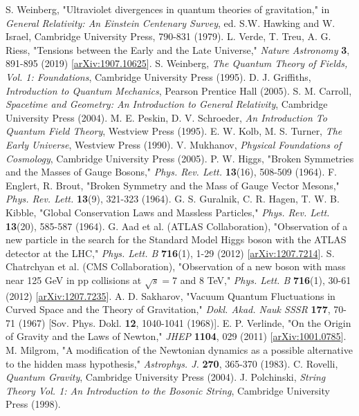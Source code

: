 \documentclass[11pt,a4paper]{article}
\begin{document}
\begin{thebibliography}{99}
 S. Weinberg, "Ultraviolet divergences in quantum theories of gravitation," in \textit{General Relativity: An Einstein Centenary Survey}, ed. S.W. Hawking and W. Israel, Cambridge University Press, 790-831 (1979). 
 L. Verde, T. Treu, A. G. Riess, "Tensions between the Early and the Late Universe," \textit{Nature Astronomy} \textbf{3}, 891-895 (2019) [\url{arXiv:1907.10625}]. 
 S. Weinberg, \textit{The Quantum Theory of Fields, Vol. 1: Foundations}, Cambridge University Press (1995). 
 D. J. Griffiths, \textit{Introduction to Quantum Mechanics}, Pearson Prentice Hall (2005). 
 S. M. Carroll, \textit{Spacetime and Geometry: An Introduction to General Relativity}, Cambridge University Press (2004). 
 M. E. Peskin, D. V. Schroeder, \textit{An Introduction To Quantum Field Theory}, Westview Press (1995). 
 E. W. Kolb, M. S. Turner, \textit{The Early Universe}, Westview Press (1990). 
 V. Mukhanov, \textit{Physical Foundations of Cosmology}, Cambridge University Press (2005). 
 P. W. Higgs, "Broken Symmetries and the Masses of Gauge Bosons," \textit{Phys. Rev. Lett.} \textbf{13}(16), 508-509 (1964). 
 F. Englert, R. Brout, "Broken Symmetry and the Mass of Gauge Vector Mesons," \textit{Phys. Rev. Lett.} \textbf{13}(9), 321-323 (1964). 
 G. S. Guralnik, C. R. Hagen, T. W. B. Kibble, "Global Conservation Laws and Massless Particles," \textit{Phys. Rev. Lett.} \textbf{13}(20), 585-587 (1964). 
 G. Aad et al. (ATLAS Collaboration), "Observation of a new particle in the search for the Standard Model Higgs boson with the ATLAS detector at the LHC," \textit{Phys. Lett. B} \textbf{716}(1), 1-29 (2012) [\url{arXiv:1207.7214}]. 
 S. Chatrchyan et al. (CMS Collaboration), "Observation of a new boson with mass near 125 GeV in pp collisions at $\sqrt{s}=7$ and 8 TeV," \textit{Phys. Lett. B} \textbf{716}(1), 30-61 (2012) [\url{arXiv:1207.7235}]. 
 A. D. Sakharov, "Vacuum Quantum Fluctuations in Curved Space and the Theory of Gravitation," \textit{Dokl. Akad. Nauk SSSR} \textbf{177}, 70-71 (1967) [Sov. Phys. Dokl. \textbf{12}, 1040-1041 (1968)]. 
 E. P. Verlinde, "On the Origin of Gravity and the Laws of Newton," \textit{JHEP} \textbf{1104}, 029 (2011) [\url{arXiv:1001.0785}]. 
 M. Milgrom, "A modification of the Newtonian dynamics as a possible alternative to the hidden mass hypothesis," \textit{Astrophys. J.} \textbf{270}, 365-370 (1983). 
 C. Rovelli, \textit{Quantum Gravity}, Cambridge University Press (2004). 
 J. Polchinski, \textit{String Theory Vol. 1: An Introduction to the Bosonic String}, Cambridge University Press (1998). 
\end{thebibliography}
\end{document}
